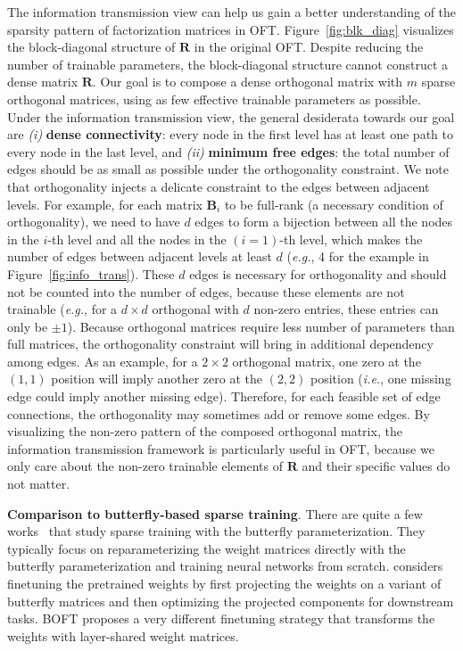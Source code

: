 The information transmission view can help us gain a better understanding of the sparsity pattern of factorization matrices in OFT. Figure~\ref{fig:blk_diag} visualizes the block-diagonal structure of $\bm{R}$ in the original OFT. Despite reducing the number of trainable parameters, the block-diagonal structure cannot construct a dense matrix $\bm{R}$. Our goal is to compose a dense orthogonal matrix with $m$ sparse orthogonal matrices, using as few effective trainable parameters as possible. Under the information transmission view, the general desiderata towards our goal are \emph{(i)} \textbf{dense connectivity}: every node in the first level has at least one path to every node in the last level, and \emph{(ii)} \textbf{minimum free edges}: the total number of edges should be as small as possible under the orthogonality constraint. We note that orthogonality injects a delicate constraint to the edges between adjacent levels. For example, for each matrix $\bm{B}_i$ to be full-rank (a necessary condition of orthogonality), we need to have $d$ edges to form a bijection between all the nodes in the $i$-th level and all the nodes in the $(i=1)$-th level, which makes the number of edges between adjacent levels at least $d$ (\emph{e.g.}, 4 for the example in Figure~\ref{fig:info_trans}). These $d$ edges is necessary for orthogonality and should not be counted into the number of edges, because these elements are not trainable (\emph{e.g.}, for a $d\times d$ orthogonal with $d$ non-zero entries, these entries can only be $\pm 1$). Because orthogonal matrices require less number of parameters than full matrices, the orthogonality constraint will bring in additional dependency among edges. As an example, for a $2\times 2$ orthogonal matrix, one zero at the $(1,1)$ position will imply another zero at the $(2,2)$ position (\emph{i.e.}, one missing edge could imply another missing edge). Therefore, for each feasible set of edge connections, the orthogonality may sometimes add or remove some edges. By visualizing the non-zero pattern of the composed orthogonal matrix, the information transmission framework is particularly useful in OFT, because we only care about the non-zero trainable elements of $\bm{R}$ and their specific values do not matter.

\textbf{Comparison to butterfly-based sparse training}. There are quite a few works~\cite{dao2019learning,dao2019kaleidoscope,chen2022pixelated,dao2022monarch} that study sparse training with the butterfly parameterization. They typically focus on reparameterizing the weight matrices directly with the butterfly parameterization and training neural networks from scratch. \cite{dao2022monarch} considers finetuning the pretrained weights by first projecting the weights on a variant of butterfly matrices and then optimizing the projected components for downstream tasks. BOFT proposes a very different finetuning strategy that transforms the weights with layer-shared weight matrices.

